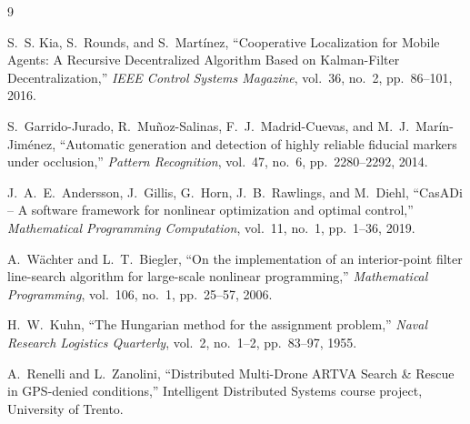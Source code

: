 \documentclass[10pt,conference]{IEEEtran}
\begin{document}
\begin{thebibliography}{9}

S.~S. Kia, S.~Rounds, and S.~Mart{\'i}nez, ``Cooperative Localization for Mobile Agents: A
Recursive Decentralized Algorithm Based on Kalman-Filter Decentralization,'' \emph{IEEE Control
Systems Magazine}, vol.~36, no.~2, pp.~86--101, 2016.

S.~Garrido-Jurado, R.~Mu{\~n}oz-Salinas, F.~J.~Madrid-Cuevas, and M.~J.~Mar{\'i}n-Jim{\'e}nez,
``Automatic generation and detection of highly reliable fiducial markers under occlusion,''
\emph{Pattern Recognition}, vol.~47, no.~6, pp.~2280--2292, 2014.

J.~A.~E.~Andersson, J.~Gillis, G.~Horn, J.~B.~Rawlings, and M.~Diehl, ``CasADi -- A software
framework for nonlinear optimization and optimal control,'' \emph{Mathematical Programming
Computation}, vol.~11, no.~1, pp.~1--36, 2019.

A.~W{\"a}chter and L.~T.~Biegler, ``On the implementation of an interior-point filter
line-search algorithm for large-scale nonlinear programming,'' \emph{Mathematical Programming},
vol.~106, no.~1, pp.~25--57, 2006.

H.~W.~Kuhn, ``The Hungarian method for the assignment problem,'' \emph{Naval Research Logistics
Quarterly}, vol.~2, no.~1--2, pp.~83--97, 1955.

A.~Renelli and L.~Zanolini, ``Distributed Multi-Drone ARTVA Search \& Rescue in GPS-denied
conditions,'' Intelligent Distributed Systems course project, University of Trento.

\end{thebibliography}
\end{document}
